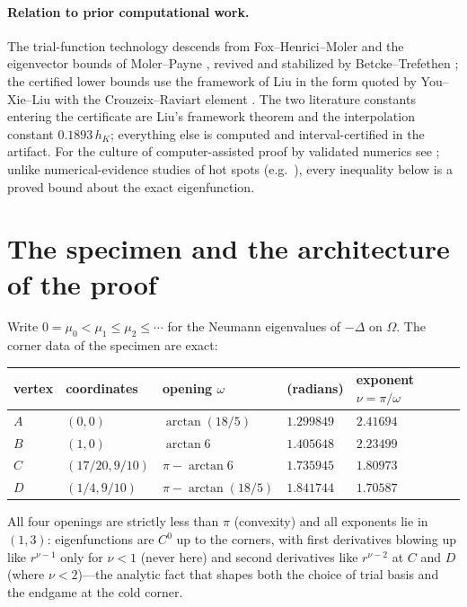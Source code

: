 \documentclass[11pt]{article}
\begin{document}
\paragraph{Relation to prior computational work.}
The trial-function technology descends from Fox--Henrici--Moler
\cite{FHM} and the eigenvector bounds of Moler--Payne \cite{MolerPayne},
revived and stabilized by Betcke--Trefethen \cite{BetckeTrefethen}; the
certified lower bounds use the framework of Liu \cite{Liu2015} in the
form quoted by You--Xie--Liu \cite{YouXieLiu} with the Crouzeix--Raviart
element \cite{CrouzeixRaviart}. The two literature constants entering
the certificate are Liu's framework theorem and the interpolation
constant $0.1893\,h_K$; everything else is computed and
interval-certified in the artifact. For the culture of computer-assisted
proof by validated numerics see \cite{vdBL,Tucker}; unlike
numerical-evidence studies of hot spots (e.g.\ \cite{Kleefeld}), every
inequality below is a proved bound about the exact eigenfunction.

\section{The specimen and the architecture of the proof}\label{sec:specimen}

Write $0=\mu_0<\mu_1\le\mu_2\le\cdots$ for the Neumann eigenvalues of
$-\Delta$ on $\Omega$. The corner data of the specimen are exact:

\begin{center}
\begin{tabular}{@{}lllll@{}}
\toprule
vertex & coordinates & opening $\omega$ & \quad(radians) & exponent $\nu=\pi/\omega$ \\
\midrule
$A$ & $(0,0)$        & $\arctan(18/5)$      & $1.299849$ & $2.41694$ \\
$B$ & $(1,0)$        & $\arctan 6$          & $1.405648$ & $2.23499$ \\
$C$ & $(17/20,9/10)$ & $\pi-\arctan 6$      & $1.735945$ & $1.80973$ \\
$D$ & $(1/4,9/10)$   & $\pi-\arctan(18/5)$  & $1.841744$ & $1.70587$ \\
\bottomrule
\end{tabular}
\end{center}

All four openings are strictly less than $\pi$ (convexity) and all
exponents lie in $(1,3)$: eigenfunctions are $C^0$ up to the corners,
with first derivatives blowing up like $r^{\nu-1}$ only for $\nu<1$
(never here) and second derivatives like $r^{\nu-2}$ at $C$ and $D$
(where $\nu<2$)---the analytic fact that shapes both the choice of trial
basis and the endgame at the cold corner.
\end{document}
